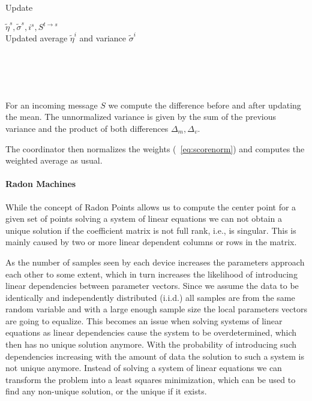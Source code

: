 \begin{algo}{Update}
    \begin{algorithm}[H]
        \label{alg:updWelford}
        \begin{algorithmic}[1]
    \REQUIRE $\tilde{\eta}^s, \tilde{\sigma}^s, i^s, S^{t \rightarrow s}$ \\
    \ENSURE  Updated average $\tilde{\eta}^i$ and variance $\tilde{\sigma}^i$ \\
    \\
    \\
    \\
    \\
\end{algorithmic}
\caption[Update procedure for the online mean and variance computation]{For an incoming message $S$ we compute the difference before and after updating the mean. The unnormalized variance is given by the sum of the previous variance and the product of both differences $\Delta_m, \Delta_v$.}
\end{algorithm}
\end{algo}

The coordinator then normalizes the weights (\eq~\ref{eq:scorenorm}) and computes the weighted average as usual.

\paragraph*{Radon Machines}
While the concept of Radon Points allows us to compute the center point for a given set of points solving a system of linear equations we can not obtain a unique solution if the coefficient matrix is not full rank, i.e., is singular.
This is mainly caused by two or more linear dependent columns or rows in the matrix.

As the number of samples seen by each device increases the parameters approach each other to some extent, which in turn increases the likelihood of introducing linear dependencies between parameter vectors.
Since we assume the data to be identically and independently distributed (i.i.d.) all samples are from the same random variable and with a large enough sample size the local parameters vectors are going to equalize.
This becomes an issue when solving systems of linear equations as linear dependencies cause the system to be overdetermined, which then has no unique solution anymore.
With the probability of introducing such dependencies increasing with the amount of data the solution to such a system is not unique anymore.
Instead of solving a system of linear equations we can transform the problem into a least squares minimization, which can be used to find any non-unique solution, or the unique if it exists.

